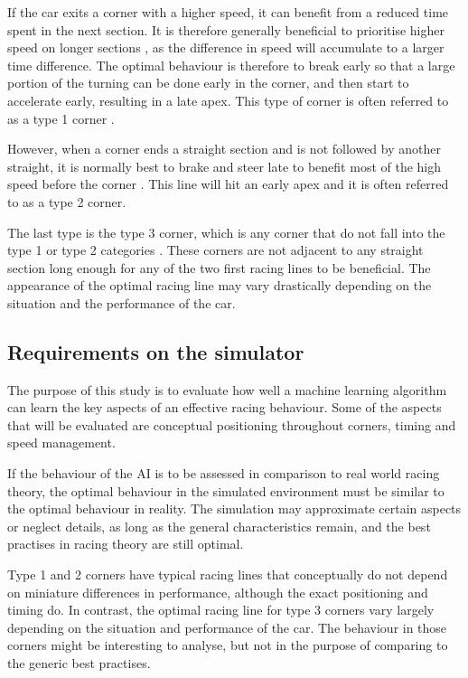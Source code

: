 If the car exits a corner with a higher speed, it can benefit from a reduced time spent in the next section. It is therefore generally beneficial to prioritise higher speed on longer sections \cite{beckman, edmondson}, as the difference in speed will accumulate to a larger time difference. The optimal behaviour is therefore to break early so that a large portion of the turning can be done early in the corner, and then start to accelerate early, resulting in a late apex. This type of corner is often referred to as a type 1 corner \cite{edmondson}.

However, when a corner ends a straight section and is not followed by another straight, it is normally best to brake and steer late to benefit most of the high speed before the corner \cite{edmondson}. This line will hit an early apex and it is often referred to as a type 2 corner.

The last type is the type 3 corner, which is any corner that do not fall into the type 1 or type 2 categories \cite{edmondson}. These corners are not adjacent to any straight section long enough for any of the two first racing lines to be beneficial. The appearance of the optimal racing line may vary drastically depending on the situation and the performance of the car.

\subsection{Requirements on the simulator}
\label{requirements}
The purpose of this study is to evaluate how well a machine learning algorithm can learn the key aspects of an effective racing behaviour. Some of the aspects that will be evaluated are conceptual positioning throughout corners, timing and speed management.

If the behaviour of the AI is to be assessed in comparison to real world racing theory, the optimal behaviour in the simulated environment must be similar to the optimal behaviour in reality. The simulation may approximate certain aspects or neglect details, as long as the general characteristics remain, and the best practises in racing theory are still optimal. 

Type 1 and 2 corners have typical racing lines that conceptually do not depend on miniature differences in performance, although the exact positioning and timing do. In contrast, the optimal racing line for type 3 corners vary largely depending on the situation and performance of the car. The behaviour in those corners might be interesting to analyse, but not in the purpose of comparing to the generic best practises.

